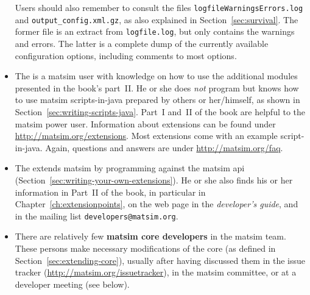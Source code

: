 \begin{itemize}
Users should also remember to consult the files \lstinline{logfileWarningsErrors.log} and \lstinline{output_config.xml.gz}, as also explained in Section~\ref{sec:survival}.  The former file is an extract from \lstinline{logfile.log}, but only contains the warnings and errors.  The latter is a complete dump of the currently available configuration options, including comments to most options.
%
\item The  is a \gls{matsim} user with knowledge on how to use the additional modules presented in the book's part~II. He or she does \emph{not} program but knows how to use \gls{matsim} scripts-in-\gls{java} prepared by others or her/himself, as shown in Section~\ref{sec:writing-scripts-java}. Part~I and~II of the book are helpful to the \gls{matsim} power user.  Information about \glspl{extension} can be found under \url{http://matsim.org/extensions}.  Most \glspl{extension} come with an example script-in-\gls{java}.  Again, questions and answers are under \url{http://matsim.org/faq}.
%
\item The  extends \gls{matsim} by programming against the \gls{matsim} \gls{api} (Section~\ref{sec:writing-your-own-extensions}). He or she also finds his or her information in Part~II of the book, in particular in Chapter~\ref{ch:extensionpoints}, on the web page in 
the \emph{developer's guide}, and in the mailing list \lstinline|developers@matsim.org|.
%
%
\item There are relatively few \textbf{\gls{matsim} core developers} in the \gls{matsim} team. 
These 
persons make necessary modifications of the core (as defined in Section~\ref{sec:extending-core}), usually after having discussed them in the issue tracker (\url{http://matsim.org/issuetracker}), in the \gls{matsim} committee, or at a developer meeting (see below). 
%
\end{itemize}
%
